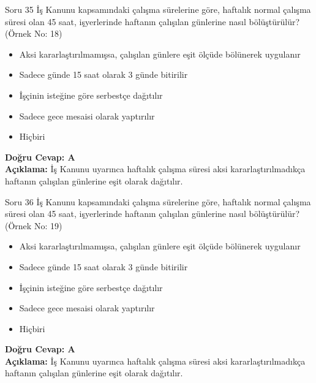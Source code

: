 \documentclass[12pt,a4paper]{article}
\begin{document}
\begin{testcard}{Soru 35}
    İş Kanunu kapsamındaki çalışma sürelerine göre, haftalık normal çalışma süresi olan 45 saat, işyerlerinde haftanın çalışılan günlerine nasıl bölüştürülür? (Örnek No: 18)
    \begin{itemize}
        \item[A)] Aksi kararlaştırılmamışsa, çalışılan günlere eşit ölçüde bölünerek uygulanır
        \item[B)] Sadece günde 15 saat olarak 3 günde bitirilir
        \item[C)] İşçinin isteğine göre serbestçe dağıtılır
        \item[D)] Sadece gece mesaisi olarak yaptırılır
        \item[E)] Hiçbiri
    \end{itemize}
    \tcblower
    \textbf{Doğru Cevap: A} \\
    \textbf{Açıklama:} İş Kanunu uyarınca haftalık çalışma süresi aksi kararlaştırılmadıkça haftanın çalışılan günlerine eşit olarak dağıtılır.
\end{testcard}

\begin{testcard}{Soru 36}
    İş Kanunu kapsamındaki çalışma sürelerine göre, haftalık normal çalışma süresi olan 45 saat, işyerlerinde haftanın çalışılan günlerine nasıl bölüştürülür? (Örnek No: 19)
    \begin{itemize}
        \item[A)] Aksi kararlaştırılmamışsa, çalışılan günlere eşit ölçüde bölünerek uygulanır
        \item[B)] Sadece günde 15 saat olarak 3 günde bitirilir
        \item[C)] İşçinin isteğine göre serbestçe dağıtılır
        \item[D)] Sadece gece mesaisi olarak yaptırılır
        \item[E)] Hiçbiri
    \end{itemize}
    \tcblower
    \textbf{Doğru Cevap: A} \\
    \textbf{Açıklama:} İş Kanunu uyarınca haftalık çalışma süresi aksi kararlaştırılmadıkça haftanın çalışılan günlerine eşit olarak dağıtılır.
\end{testcard}
\end{document}
